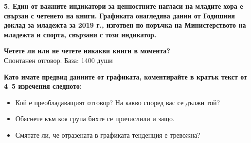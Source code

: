 \documentclass[12pt,a4paper]{article}
\begin{document}
\vspace{0.6cm}

\noindent
\textbf{5. Един от важните индикатори за ценностните нагласи на младите хора е свързан с четенето на книги. Графиката онагледява данни от Годишния доклад за младежта за 2019 г., изготвен по поръчка на Министерството на младежта и спорта, свързани с този индикатор.}

\vspace{0.3cm}

\begin{center}
\textbf{Четете ли или не четете някакви книги в момента?} \\
Спонтанен отговор. База: 1400 души

\vspace{0.3cm}

\usetikzlibrary{patterns}

\end{center}

\vspace{0.3cm}

\noindent
\textbf{Като имате предвид данните от графиката, коментирайте в кратък текст от 4–5 изречения следното:}
\begin{itemize}[noitemsep, topsep=0pt, parsep=0pt, itemsep=0.4em]
    \item Кой е преобладаващият отговор? На какво според вас се дължи той?
    \item Обяснете към коя група бихте се причислили и защо.
    \item Смятате ли, че отразената в графиката тенденция е тревожна?
\end{itemize}
\end{document}
